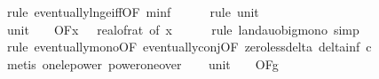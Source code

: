 \begin{isabellebody}
\ {\isacharparenleft}{\kern0pt}rule\ eventually{\isacharunderscore}{\kern0pt}ln{\isacharunderscore}{\kern0pt}ge{\isacharunderscore}{\kern0pt}iff{\isacharbrackleft}{\kern0pt}OF\ m{\isacharunderscore}{\kern0pt}inf{\isacharbrackright}{\kern0pt}{\isacharparenright}{\kern0pt}\isanewline
\ \ \ \ \isamarkupfalse%
\ {\isacharparenleft}{\kern0pt}rule\ unit{\isacharunderscore}{\kern0pt}{}{}{\isacharparenright}{\kern0pt}\isanewline
\isanewline
\ \ \isamarkupfalse%
\ unit{\isacharunderscore}{\kern0pt}{}{\isacharcolon}{\kern0pt}\ {\isachardoublequoteopen}{\isacharparenleft}{\kern0pt}{\isasymlambda}{\isacharunderscore}{\kern0pt}{\isachardot}{\kern0pt}\ {}{\isacharparenright}{\kern0pt}\ {\isasymin}\ O{\isacharbrackleft}{\kern0pt}{\isacharquery}{\kern0pt}F{\isacharbrackright}{\kern0pt}{\isacharparenleft}{\kern0pt}{\isasymlambda}x{\isachardot}{\kern0pt}\ {}\ {\isacharslash}{\kern0pt}\ {\isacharparenleft}{\kern0pt}real{\isacharunderscore}{\kern0pt}of{\isacharunderscore}{\kern0pt}rat\ {\isacharparenleft}{\kern0pt}{\isasymdelta}{\isacharunderscore}{\kern0pt}of\ x{\isacharparenright}{\kern0pt}{\isacharparenright}{\kern0pt}\isanewline
\ \ \ \ \isamarkupfalse%
\ {\isacharparenleft}{\kern0pt}rule\ landau{\isacharunderscore}{\kern0pt}o{\isachardot}{\kern0pt}big{\isacharunderscore}{\kern0pt}mono{\isacharcomma}{\kern0pt}\ simp{\isacharparenright}{\kern0pt}\isanewline
\ \ \ \ \isamarkupfalse%
\ {\isacharparenleft}{\kern0pt}rule\ eventually{\isacharunderscore}{\kern0pt}mono{\isacharbrackleft}{\kern0pt}OF\ eventually{\isacharunderscore}{\kern0pt}conj{\isacharbrackleft}{\kern0pt}OF\ zero{\isacharunderscore}{\kern0pt}less{\isacharunderscore}{\kern0pt}delta\ delta{\isacharunderscore}{\kern0pt}inf{\isacharbrackleft}{\kern0pt}\ c{\isacharequal}{\kern0pt}{\isachardoublequoteopen}{}{\isachardoublequoteclose}{\isacharbrackright}{\kern0pt}{\isacharbrackright}{\kern0pt}{\isacharbrackright}{\kern0pt}{\isacharparenright}{\kern0pt}\isanewline
\ \ \ \ \isamarkupfalse%
\ {\isacharparenleft}{\kern0pt}metis\ one{\isacharunderscore}{\kern0pt}le{\isacharunderscore}{\kern0pt}power\ power{\isacharunderscore}{\kern0pt}one{\isacharunderscore}{\kern0pt}over{\isacharparenright}{\kern0pt}\isanewline
\isanewline
\ \ \isamarkupfalse%
\ unit{\isacharunderscore}{\kern0pt}{}{\isacharcolon}{\kern0pt}\ {\isachardoublequoteopen}{\isacharparenleft}{\kern0pt}{\isasymlambda}{\isacharunderscore}{\kern0pt}{\isachardot}{\kern0pt}\ {}{\isacharparenright}{\kern0pt}\ {\isasymin}\ O{\isacharbrackleft}{\kern0pt}{\isacharquery}{\kern0pt}F{\isacharbrackright}{\kern0pt}{\isacharparenleft}{\kern0pt}g{}{\isacharparenright}{\kern0pt}{\isachardoublequoteclose}\isanewline

\end{isabellebody}
